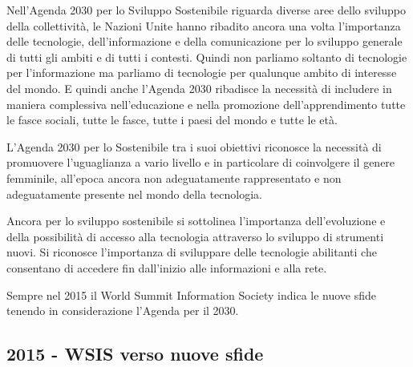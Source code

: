 Nell'Agenda 2030 per lo Sviluppo Sostenibile riguarda diverse aree dello sviluppo della collettività, le Nazioni Unite hanno ribadito ancora una volta l'importanza delle tecnologie, dell'informazione e della comunicazione per lo sviluppo generale di tutti gli ambiti e di tutti i contesti. Quindi non parliamo soltanto di tecnologie per l'informazione ma parliamo di tecnologie per qualunque ambito di interesse del mondo. E quindi anche l'Agenda 2030 ribadisce la necessità di includere in maniera complessiva nell'educazione e nella promozione dell'apprendimento tutte le fasce sociali, tutte le fasce, tutte i paesi del mondo e tutte le età. \par
L'Agenda 2030 per lo Sostenibile tra i suoi obiettivi riconosce la necessità di promuovere l'uguaglianza a vario livello e in particolare di coinvolgere il genere femminile, all'epoca ancora non adeguatamente rappresentato e non adeguatamente presente nel mondo della tecnologia.\par
Ancora per lo sviluppo sostenibile si sottolinea l'importanza dell'evoluzione e della possibilità di accesso alla tecnologia attraverso lo sviluppo di strumenti nuovi. Si riconosce l'importanza di sviluppare delle tecnologie abilitanti che consentano di accedere fin dall'inizio alle informazioni e alla rete. \par
Sempre nel 2015 il World Summit Information Society indica le nuove sfide tenendo in considerazione l'Agenda per il 2030.
\subsection{2015 - WSIS verso nuove sfide}

